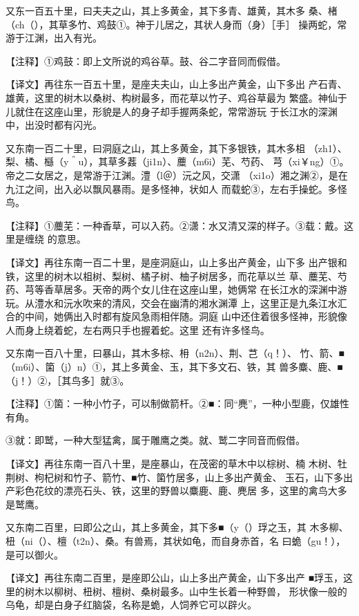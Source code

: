 \documentclass[a4paper,12pt,UTF8,twoside]{ctexbook}
\begin{document}
又东一百五十里，曰夫夫之山，其上多黄金，其下多青、雄黄，其木多 桑、楮（ch（），其草多竹、鸡鼓①。神于儿居之，其状人身而（身）［手］ 操两蛇，常游于江渊，出入有光。

【注释】①鸡鼓：即上文所说的鸡谷草。鼓、谷二字音同而假借。

【译文】再往东一百五十里，是座夫夫山，山上多出产黄金，山下多出 产石青、雄黄，这里的树木以桑树、构树最多，而花草以竹子、鸡谷草最为 繁盛。神仙于儿就住在这座山里，形貌是人的身子却手握两条蛇，常常游玩 于长江水的深渊中，出没时都有闪光。

又东南一百二十里，曰洞庭之山，其上多黄金，其下多银铁，其木多柤 （zh1）、梨、橘、櫾（y＾u），其草多葌（ji1n）、蘪（m6i）芜、芍药、 芎（xi￥ng）①。帝之二女居之，是常游于江渊。澧（l＠）沅之风，交潇 （xi1o）湘之渊②，是在九江之间，出入必以飘风暴雨。是多怪神，状如人 而载蛇③，左右手操蛇。多怪鸟。

【注释】①蘪芜：一种香草，可以入药。②潇：水又清又深的样子。③载：戴。这里是缠绕 的意思。

【译文】再往东南一百二十里，是座洞庭山，山上多出产黄金，山下多 出产银和铁，这里的树木以柤树、梨树、橘子树、柚子树居多，而花草以兰 草、蘪芜、芍药、芎等香草居多。天帝的两个女儿住在这座山里，她俩常 在长江水的深渊中游玩。从澧水和沅水吹来的清风，交会在幽清的湘水渊潭 上，这里正是九条江水汇合的中间，她俩出入时都有旋风急雨相伴随。洞庭 山中还住着很多怪神，形貌像人而身上绕着蛇，左右两只手也握着蛇。这里 还有许多怪鸟。

又东南一百八十里，曰暴山，其木多棕、枏（n2n）、荆、芑（q！）、 竹、箭、■（m6i）、箘（j）n）①，其上多黄金、玉，其下多文石、铁，其 兽多麋、鹿、■（j！）②，［其鸟多］就③。

【注释】①箘：一种小竹子，可以制做箭杆。②■：同“麂”，一种小型鹿，仅雄性有角。

③就：即鹫，一种大型猛禽，属于雕鹰之类。就、鹫二字同音而假借。

【译文】再往东南一百八十里，是座暴山，在茂密的草木中以棕树、楠 木树、牡荆树、枸杞树和竹子、箭竹、■竹、箘竹居多，山上多出产黄金、 玉石，山下多出产彩色花纹的漂亮石头、铁，这里的野兽以麋鹿、鹿、麂居 多，这里的禽鸟大多是鹫鹰。

又东南二百里，曰即公之山，其上多黄金，其下多■（y（）琈之玉，其 木多柳、杻（ni（）、檀（t2n）、桑。有兽焉，其状如龟，而自身赤首，名 曰蛫（gu！），是可以御火。

【译文】再往东南二百里，是座即公山，山上多出产黄金，山下多出产 ■琈玉，这里的树木以柳树、杻树、檀树、桑树最多。山中生长着一种野兽， 形状像一般的乌龟，却是白身子红脑袋，名称是蛫，人饲养它可以辟火。
\end{document}
